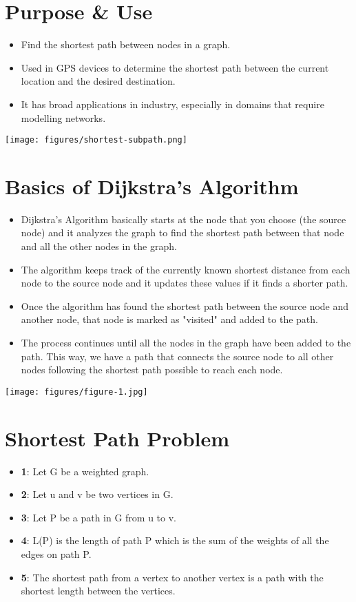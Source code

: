 \section{Purpose \& Use}
\begin{itemize}
    \item Find the shortest path between nodes in a graph.
    \item Used in GPS devices to determine the shortest path between the current location and the desired destination.
    \item It has broad applications in industry, especially in domains that require modelling networks.
\end{itemize}
\texttt{[image: figures/shortest-subpath.png]}


\section{Basics of Dijkstra's Algorithm}
\begin{itemize}
    \item Dijkstra's Algorithm basically starts at the node that you choose (the source node) and it analyzes the graph to find the shortest path between that node and all the other nodes in the graph.
    \item The algorithm keeps track of the currently known shortest distance from each node to the source node and it updates these values if it finds a shorter path.
    \item Once the algorithm has found the shortest path between the source node and another node, that node is marked as "visited" and added to the path.
    \item The process continues until all the nodes in the graph have been added to the path. This way, we have a path that connects the source node to all other nodes following the shortest path possible to reach each node.
\end{itemize}
\texttt{[image: figures/figure-1.jpg]}


\section{Shortest Path Problem}
\begin{itemize}
    \item \textbf{1}: Let G be a weighted graph.
    \item \textbf{2}: Let u and v be two vertices in G.
    \item \textbf{3}: Let P be a path in G from u to v.
    \item \textbf{4}: L(P) is the length of path P which is the sum of the weights of all the edges on path P.
    \item \textbf{5}: The shortest path from a vertex to another vertex is a path with the shortest length between the vertices.
\end{itemize}


